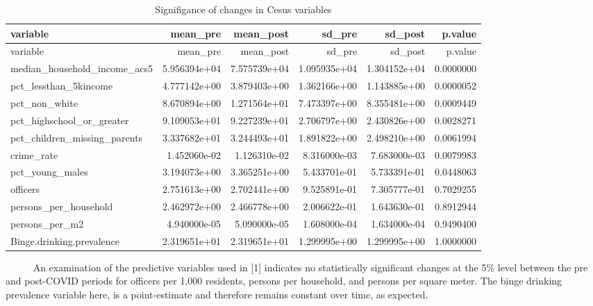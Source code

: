 \documentclass[
  11pt,
  letterpaper,
  DIV=11,
  numbers=noendperiod]{scrartcl}
\begin{document}
\begin{longtable}[]{@{}lrrrrr@{}}
\caption{Signifigance of changes in Cesus variables}\tabularnewline
\toprule\noalign{}
variable & mean\_pre & mean\_post & sd\_pre & sd\_post & p.value \\
\midrule\noalign{}
\endfirsthead
\toprule\noalign{}
variable & mean\_pre & mean\_post & sd\_pre & sd\_post & p.value \\
\midrule\noalign{}
\endhead
\bottomrule\noalign{}
\endlastfoot
median\_household\_income\_acs5 & 5.956394e+04 & 7.575739e+04 &
1.095935e+04 & 1.304152e+04 & 0.0000000 \\
pct\_lessthan\_5kincome & 4.777142e+00 & 3.879403e+00 & 1.362166e+00 &
1.143885e+00 & 0.0000052 \\
pct\_non\_white & 8.670894e+00 & 1.271564e+01 & 7.473397e+00 &
8.355481e+00 & 0.0009449 \\
pct\_highschool\_or\_greater & 9.109053e+01 & 9.227239e+01 &
2.706797e+00 & 2.430826e+00 & 0.0028271 \\
pct\_children\_missing\_parents & 3.337682e+01 & 3.244493e+01 &
1.891822e+00 & 2.498210e+00 & 0.0061994 \\
crime\_rate & 1.452060e-02 & 1.126310e-02 & 8.316000e-03 & 7.683000e-03
& 0.0079983 \\
pct\_young\_males & 3.194073e+00 & 3.365251e+00 & 5.433701e-01 &
5.733391e-01 & 0.0448063 \\
officers & 2.751613e+00 & 2.702441e+00 & 9.525891e-01 & 7.305777e-01 &
0.7029255 \\
persons\_per\_household & 2.462972e+00 & 2.466778e+00 & 2.006622e-01 &
1.643630e-01 & 0.8912944 \\
persons\_per\_m2 & 4.940000e-05 & 5.090000e-05 & 1.608000e-04 &
1.634000e-04 & 0.9490400 \\
Binge.drinking.prevalence & 2.319651e+01 & 2.319651e+01 & 1.299995e+00 &
1.299995e+00 & 1.0000000 \\
\end{longtable}

~~~~~ An examination of the predictive variables used in {[}1{]}
indicates no statistically significant changes at the 5\% level between
the pre and post-COVID periods for officers per 1,000 residents, persons
per household, and persons per square meter. The binge drinking
prevalence variable here, is a point-estimate and therefore remains
constant over time, as expected.
\end{document}
